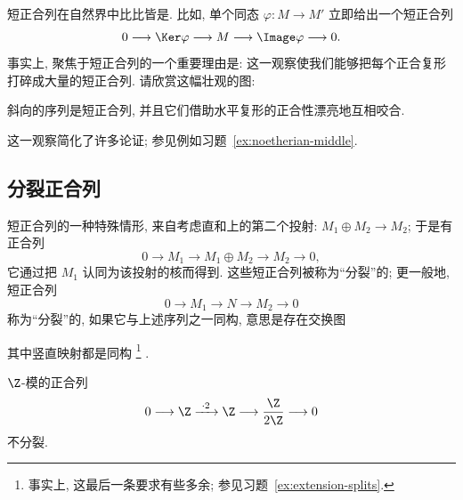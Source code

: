 短正合列在自然界中比比皆是. 比如, 单个同态 $\varphi : M \to M'$ 立即给出一个短正合列
\[
0 \longrightarrow \Ker \varphi \longrightarrow M \longrightarrow \Image \varphi \longrightarrow 0.
\]
事实上, 聚焦于短正合列的一个重要理由是: 这一观察使我们能够把每个正合复形打碎成大量的短正合列. 请欣赏这幅壮观的图:
\begin{center}
\end{center}
斜向的序列是短正合列, 并且它们借助水平复形的正合性漂亮地互相咬合.

这一观察简化了许多论证; 参见例如习题~\ref{ex:noetherian-middle}.

\subsection{分裂正合列}
\label{subsec:split-exact}

短正合列的一种特殊情形, 来自考虑直和上的第二个投射: $M_1 \oplus M_2 \to M_2$; 于是有正合列
\[
0 \longrightarrow M_1 \longrightarrow M_1 \oplus M_2 \longrightarrow M_2 \longrightarrow 0,
\]
它通过把 $M_1$ 认同为该投射的核而得到. 这些短正合列被称为``分裂''的; 更一般地, 短正合列
\[
0 \longrightarrow M_1 \longrightarrow N \longrightarrow M_2 \longrightarrow 0
\]
称为``分裂''的, 如果它与上述序列之一同构, 意思是存在交换图
\begin{center}
\end{center}
其中竖直映射都是同构%
\footnote{事实上, 这最后一条要求有些多余; 参见习题~\ref{ex:extension-splits}.}%
.

\begin{example}
\label{ex:not-split}
$\Z$-模的正合列
\[
0 \longrightarrow \Z \xrightarrow{\ \cdot 2\ } \Z \longrightarrow \frac{\Z}{2\Z} \longrightarrow 0
\]
不分裂.
\end{example}

